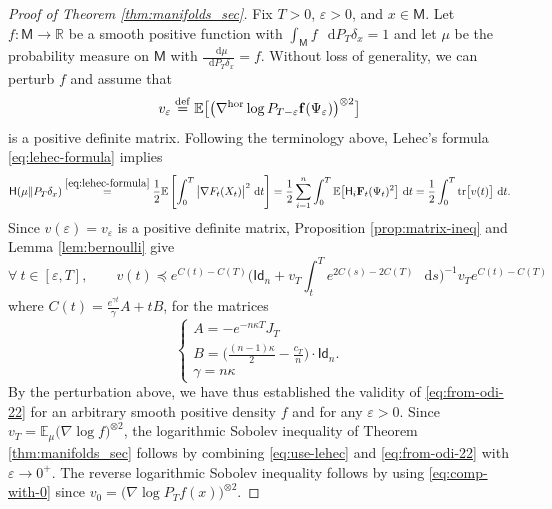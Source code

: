 \documentclass[a4paper,twoside,11pt,reqno]{amsart}
\newcommand{\eqdef}{\stackrel{\mathrm{def}}{=}}
\newcommand*\diff{\mathop{}\!\mathrm{d}}
\newcommand{\R}{\mathbb{R}} %
\newcommand{\li}{\bf }
\newcommand{\e}{\varepsilon}
\newcommand{\MM}{\mathsf{M}}
\newcommand{\mb}{\mathbb}
\newcommand{\msf}{\mathsf}
\newcommand{\mr}{\mathrm}
\newcommand{\HH}{\mathsf{H}}
\begin{document}
\begin{proof} [Proof of Theorem \ref{thm:manifolds_sec}]
Fix $T>0$,  $\e>0$, and $x\in\MM$. Let $f:\MM\to\R$ be a smooth positive function with $\int_\MM f\,\diff P_T\delta_x = 1$ and let $\mu$ be the probability measure on $\MM$ with $\tfrac{\diff\mu}{\diff P_T\delta_x}=f$.  Without loss of generality, we can perturb $f$ and assume that 
\begin{equation}
v_\e \eqdef \mb{E}\big[ \big( \nabla^{\mr{hor}} \log  P_{T-\e}{\li f}(\Psi_\e)\big)^{\otimes 2}\big] 
\end{equation} 
is a positive definite matrix. Following the terminology above, Lehec's formula \eqref{eq:lehec-formula} implies
\begin{equation}  \label{eq:use-lehec}
\HH(\mu \| P_T\delta_x)  \stackrel{\eqref{eq:lehec-formula}}{=} \frac{1}{2}\mb{E} \left[ \int_0^T \big| \nabla F_t(X_t)\big|^2\,\diff t \right] = \frac{1}{2} \sum_{i=1}^n \int_0^T \mb{E}\big[ \HH_i {\li F}_t(\Psi_t)^2\big]\,\diff t = \frac{1}{2}\int_0^T \mr{tr}\big[ v(t)\big] \,\diff t.
\end{equation}
Since $v(\e) = v_\e$ is a positive definite matrix, Proposition \ref{prop:matrix-ineq} and Lemma \ref{lem:bernoulli} give
\begin{equation} \label{eq:from-odi-22}
\forall \ t\in[\e,T],\qquad v(t) \preceq e^{C(t)-C(T)} \Big( \msf{Id}_n + v_T \int_t^{T} e^{2C(s)-2C(T)}\,\diff s \Big)^{-1} v_T e^{C(t)-C(T)}
\end{equation}
where $C(t) = \frac{e^{\gamma t}}{\gamma} A + tB$, for the matrices
\begin{equation}
\begin{cases}
A =- e^{-n\kappa T} J_T \\ B = \big(\tfrac{(n-1)\kappa}{2} - \tfrac{c_T}{n}\big) \cdot \msf{Id}_n. \\ \gamma = n\kappa
\end{cases}
\end{equation}
By the perturbation above, we have thus established the validity of \eqref{eq:from-odi-22} for an arbitrary smooth positive density $f$ and for any $\e>0$.  Since $v_T = \mb{E}_\mu \big( \nabla \log  f\big)^{\otimes 2}$, the logarithmic Sobolev inequality of Theorem \ref{thm:manifolds_sec} follows by combining \eqref{eq:use-lehec} and \eqref{eq:from-odi-22} with $\e\to0^+$. The reverse logarithmic Sobolev inequality follows by using \eqref{eq:comp-with-0} since $v_0 = \big(\nabla \log P_Tf(x)\big)^{\otimes 2}$.
\end{proof}
\end{document}
